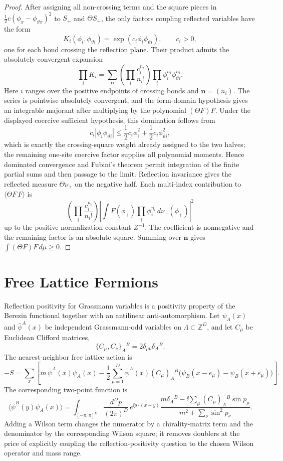 \begin{proof}
After assigning all non-crossing terms and the square pieces in
\(\frac12c(\phi_x-\phi_{\vartheta x})^2\) to \(S_+\) and \(\Theta S_+\), the
only factors coupling reflected variables have the form
\[
  K_i(\phi_i,\phi_{\vartheta i})
  =
  \exp(c_i\phi_i\phi_{\vartheta i}),
  \qquad c_i>0,
\]
one for each bond crossing the reflection plane.  Their product admits the
absolutely convergent expansion
\[
  \prod_i K_i
  =
  \sum_{\mathbf n}
  \left(\prod_i\frac{c_i^{n_i}}{n_i!}\right)
  \prod_i\phi_i^{n_i}\phi_{\vartheta i}^{n_i}.
\]
Here \(i\) ranges over the positive endpoints of crossing bonds and
\(\mathbf n=(n_i)\).  The series is pointwise absolutely convergent, and the
form-domain hypothesis gives an integrable majorant after multiplying by the
polynomial \((\Theta F)F\).  Under the displayed coercive sufficient
hypothesis, this domination follows from
\[
  c_i|\phi_i\phi_{\vartheta i}|
  \leq
  \frac12c_i\phi_i^2+\frac12c_i\phi_{\vartheta i}^2,
\]
which is exactly the crossing-square weight already assigned to the two
halves; the remaining one-site coercive factor supplies all polynomial
moments.  Hence dominated convergence and Fubini's theorem permit integration
of the finite partial sums and then passage to the limit.
Reflection invariance gives the reflected measure \(\Theta\nu_+\) on the
negative half.  Each multi-index contribution to
\(\langle\Theta F\,F\rangle\) is
\[
  \left(\prod_i\frac{c_i^{n_i}}{n_i!}\right)
  \left|
    \int F(\phi_+)\prod_i\phi_i^{n_i}\,d\nu_+(\phi_+)
  \right|^2
\]
up to the positive normalization constant \(Z^{-1}\).  The coefficient is
nonnegative and the remaining factor is an absolute square.  Summing over
\(\mathbf n\) gives
\(\int (\Theta F)F\,d\mu\geq0\).
\end{proof}

\section{Free Lattice Fermions}

Reflection positivity for Grassmann variables is a positivity property of the
Berezin functional together with an antilinear anti-automorphism.  Let
\(\psi_A(x)\) and \(\bar\psi^A(x)\) be independent Grassmann-odd variables on
\(\Lambda\subset\mathbb Z^D\), and let \(C_\mu\) be Euclidean Clifford
matrices,
\[
  \{C_\mu,C_\nu\}_A{}^B=2\delta_{\mu\nu}\delta_A{}^B .
\]
The nearest-neighbor free lattice action is
\[
  -S
  =
  \sum_x\left[
  m\,\bar\psi^A(x)\psi_A(x)
  -\frac12\sum_{\mu=1}^D
  \bar\psi^A(x)(C_\mu)_A{}^B
  \bigl(\psi_B(x-e_\mu)-\psi_B(x+e_\mu)\bigr)
  \right].
\]
The corresponding two-point function is
\[
  \langle \bar\psi^B(y)\psi_A(x)\rangle
  =
  \int_{[-\pi,\pi]^D}\frac{d^Dp}{(2\pi)^D}\,
  e^{\ii p\cdot(x-y)}
  \frac{
  m\delta_A{}^B-\ii\sum_\mu(C_\mu)_A{}^B\sin p_\mu}
  {m^2+\sum_\nu\sin^2p_\nu}.
\]
Adding a Wilson term changes the numerator by a chirality-matrix term and
the denominator by the corresponding Wilson square; it removes doublers at
the price of explicitly coupling the reflection-positivity question to the
chosen Wilson operator and mass range.

